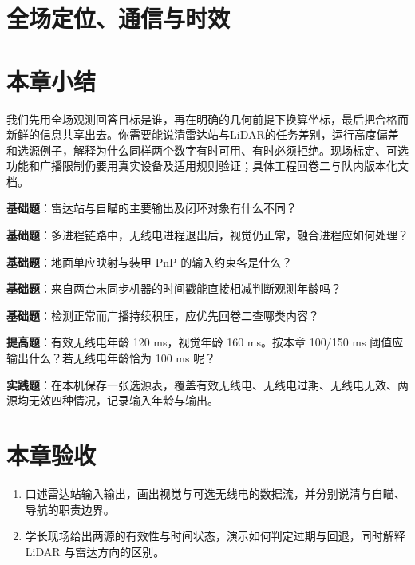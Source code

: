 \documentclass[
  lang=cn,
  scheme=chinese,
  chinesefont=ctexfont,
  11pt,
  oneside,
  device=normal,
  color=cyan,
  mode=fancy
]{elegantbook}
\begin{document}
\section{全场定位、通信与时效}


\clearpage
\section{本章小结}
\begin{conclusion}
我们先用全场观测回答目标是谁，再在明确的几何前提下换算坐标，最后把合格而新鲜的信息共享出去。你需要能说清雷达站与LiDAR的任务差别，运行高度偏差和选源例子，解释为什么同样两个数字有时可用、有时必须拒绝。现场标定、可选功能和广播限制仍要用真实设备及适用规则验证；具体工程回卷二与队内版本化文档。
\end{conclusion}

\begin{problemset}
\item \label{v3-prob-radar-1}\textbf{基础题}：雷达站与自瞄的主要输出及闭环对象有什么不同？
\item \label{v3-prob-radar-2}\textbf{基础题}：多进程链路中，无线电进程退出后，视觉仍正常，融合进程应如何处理？
\item \label{v3-prob-radar-3}\textbf{基础题}：地面单应映射与装甲 PnP 的输入约束各是什么？
\item \label{v3-prob-radar-4}\textbf{基础题}：来自两台未同步机器的时间戳能直接相减判断观测年龄吗？
\item \label{v3-prob-radar-5}\textbf{基础题}：检测正常而广播持续积压，应优先回卷二查哪类内容？
\item \label{v3-prob-radar-6}\textbf{提高题}：有效无线电年龄 120 ms，视觉年龄 160 ms。按本章 100/150 ms 阈值应输出什么？若无线电年龄恰为 100 ms 呢？
\item \label{v3-prob-radar-7}\textbf{实践题}：在本机保存一张选源表，覆盖有效无线电、无线电过期、无线电无效、两源均无效四种情况，记录输入年龄与输出。
\end{problemset}

\section{本章验收}
\begin{enumerate}
  \item 口述雷达站输入输出，画出视觉与可选无线电的数据流，并分别说清与自瞄、导航的职责边界。
  \item 学长现场给出两源的有效性与时间状态，演示如何判定过期与回退，同时解释 LiDAR 与雷达方向的区别。
\end{enumerate}
\end{document}
